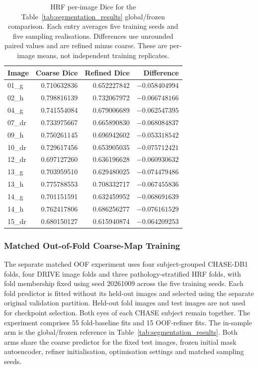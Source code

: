 \documentclass[jimaging,article,submit,pdftex,moreauthors]
  {Definitions/mdpi}
\providecommand{\linelabel}[1]{}
\newcommand{\seclabel}[1]{\linelabel{rev:sec:#1}}
\newcommand{\secend}[1]{\linelabel{rev:end:#1}}
\begin{document}
\begin{table}[htbp]
\centering
\caption{HRF per-image Dice for the Table~\ref{tab:segmentation_results} global/frozen comparison. Each entry averages five training seeds and five sampling realisations. Differences use unrounded paired values and are refined minus coarse. These are per-image means, not independent training replicates.}
\label{tab:paired_per_image_hrf}
\small
\begin{tabular}{lrrr}
\toprule
Image & Coarse Dice & Refined Dice & Difference \\
\midrule
01\_g & 0.710632836 & 0.652227842 & $-0.058404994$ \\
02\_h & 0.798816139 & 0.732067972 & $-0.066748166$ \\
04\_g & 0.741554084 & 0.679006689 & $-0.062547395$ \\
07\_dr & 0.733975667 & 0.665890830 & $-0.068084837$ \\
09\_h & 0.750261145 & 0.696942602 & $-0.053318542$ \\
10\_dr & 0.729617456 & 0.653905035 & $-0.075712421$ \\
12\_dr & 0.697127260 & 0.636196628 & $-0.060930632$ \\
13\_g & 0.703959510 & 0.629480025 & $-0.074479486$ \\
13\_h & 0.775788553 & 0.708332717 & $-0.067455836$ \\
14\_g & 0.701151591 & 0.632459952 & $-0.068691639$ \\
14\_h & 0.762417806 & 0.686256277 & $-0.076161529$ \\
15\_dr & 0.680150127 & 0.615940874 & $-0.064209253$ \\
\bottomrule
\end{tabular}
\end{table}

\FloatBarrier
\secend{paired_per_image}
\subsubsection{Matched Out-of-Fold Coarse-Map Training}
\label{sec:oof}
\seclabel{oof}
The separate matched OOF experiment uses four subject-grouped CHASE-DB1 folds, four DRIVE image folds and three pathology-stratified HRF folds, with fold membership fixed using seed 20261009 across the five training seeds. Each fold predictor is fitted without its held-out images and selected using the separate original validation partition. Held-out fold images and test images are not used for checkpoint selection. Both eyes of each CHASE subject remain together. The experiment comprises 55 fold-baseline fits and 15 OOF-refiner fits. The in-sample arm is the global/frozen reference in Table~\ref{tab:segmentation_results}. Both arms share the coarse predictor for the fixed test images, frozen initial mask autoencoder, refiner initialisation, optimisation settings and matched sampling seeds.
\end{document}
